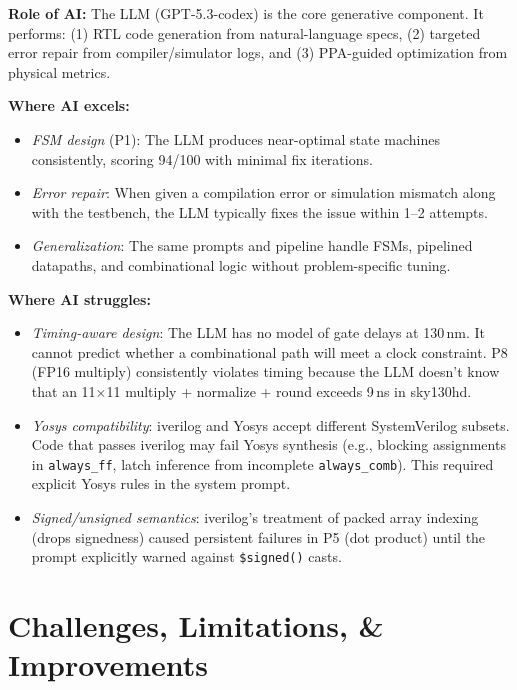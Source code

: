 \documentclass[10pt]{article}
\begin{document}
\textbf{Role of AI:} The LLM (GPT-5.3-codex) is the core generative component. It performs: (1) RTL code generation from natural-language specs, (2) targeted error repair from compiler/simulator logs, and (3) PPA-guided optimization from physical metrics.

\textbf{Where AI excels:}
\begin{itemize}[topsep=2pt,itemsep=0pt]
  \item \emph{FSM design} (P1): The LLM produces near-optimal state machines consistently, scoring 94/100 with minimal fix iterations.
  \item \emph{Error repair}: When given a compilation error or simulation mismatch along with the testbench, the LLM typically fixes the issue within 1--2 attempts.
  \item \emph{Generalization}: The same prompts and pipeline handle FSMs, pipelined datapaths, and combinational logic without problem-specific tuning.
\end{itemize}

\textbf{Where AI struggles:}
\begin{itemize}[topsep=2pt,itemsep=0pt]
  \item \emph{Timing-aware design}: The LLM has no model of gate delays at 130\,nm. It cannot predict whether a combinational path will meet a clock constraint. P8 (FP16 multiply) consistently violates timing because the LLM doesn't know that an 11$\times$11 multiply + normalize + round exceeds 9\,ns in sky130hd.
  \item \emph{Yosys compatibility}: iverilog and Yosys accept different SystemVerilog subsets. Code that passes iverilog may fail Yosys synthesis (e.g., blocking assignments in \texttt{always\_ff}, latch inference from incomplete \texttt{always\_comb}). This required explicit Yosys rules in the system prompt.
  \item \emph{Signed/unsigned semantics}: iverilog's treatment of packed array indexing (drops signedness) caused persistent failures in P5 (dot product) until the prompt explicitly warned against \texttt{\$signed()} casts.
\end{itemize}

\section{Challenges, Limitations, \& Improvements}
\end{document}
